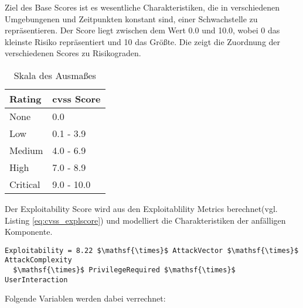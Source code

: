     \noindent Ziel des Base Scores ist es wesentliche Charakteristiken, die in verschiedenen Umgebungenen und Zeitpunkten konstant sind, einer Schwachstelle zu repräsentieren. 
    Der Score liegt zwischen dem Wert 0.0 und 10.0, wobei 0 das kleinste Risiko repräsentiert und 10 das Größte\cite{CVSSspec}. 
    Die  zeigt die Zuordnung der verschiedenen Scores zu Risikograden. 
    \begin{table}[H]
        \centering
        \begin{tabular}{|m{}|m{}|}
        \hline
        \textbf{Rating}   & \textbf{\gls{cvss} Score}   \\ \hline
        None              & 0.0                         \\ \hline
        Low               & 0.1 - 3.9                   \\ \hline
        Medium            & 4.0 - 6.9                   \\ \hline
        High              & 7.0 - 8.9                   \\ \hline
        Critical          & 9.0 - 10.0                  \\ \hline
        \end{tabular}
        \caption{Skala des Ausmaßes\cite{CVSSspec}}
        \label{tab:cvss_severity}
    \end{table}
    \noindent Der Exploitability Score wird aus den Exploitablility Metrics berechnet(vgl. Listing \ref{eq:cvss_explscore}) und modelliert die Charakteristiken der anfälligen Komponente. 
    \smallskip\\
    \begin{lstlisting}[caption={Berechnung des Exploitability Score \cite{CVSSspec}},label=eq:cvss_explscore,captionpos=b,mathescape=true]
Exploitability = 8.22 $\mathsf{\times}$ AttackVector $\mathsf{\times}$ AttackComplexity 
  $\mathsf{\times}$ PrivilegeRequired $\mathsf{\times}$ UserInteraction
    \end{lstlisting}
    \noindent Folgende Variablen werden dabei verrechnet:
